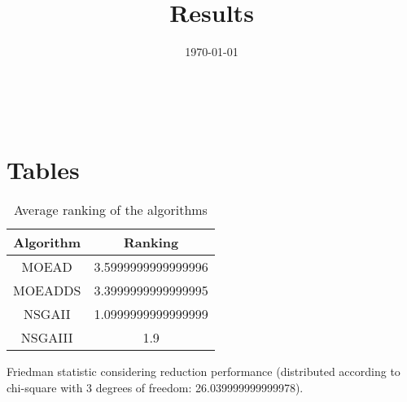\documentclass{article}
\title{Results}
\author{}
\date{\today}
\begin{document}
\oddsidemargin 0in \topmargin 0in\maketitle
\
\section{Tables}
\begin{table}[!htp]
\centering
\caption{Average ranking of the algorithms}
\begin{tabular}{c|c}
Algorithm&Ranking\\
\hline
MOEAD&3.5999999999999996\\
MOEADDS&3.3999999999999995\\
NSGAII&1.0999999999999999\\
NSGAIII&1.9\\
\end{tabular}
\end{table}


Friedman statistic considering reduction performance (distributed according to chi-square with 3 degrees of freedom: 26.039999999999978).
\end{document}
